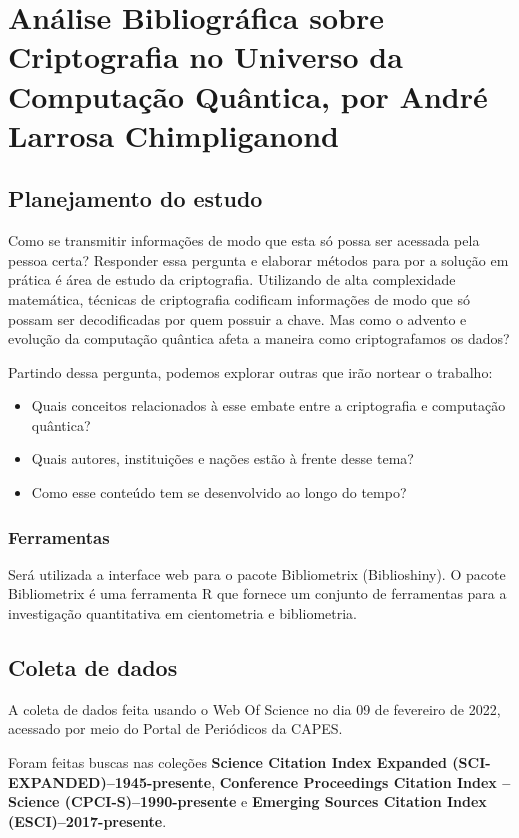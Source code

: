 
\chapter{Análise Bibliográfica sobre Criptografia no Universo da Computação Quântica, por André Larrosa Chimpliganond}

\section{Planejamento do estudo}
Como se transmitir informações de modo que esta só possa ser acessada pela pessoa certa? Responder essa pergunta e elaborar métodos para por a solução em prática é área de estudo da criptografia. Utilizando de alta complexidade matemática, técnicas de criptografia codificam informações de modo que só possam ser decodificadas por quem possuir a chave. Mas como o advento e evolução da computação quântica afeta a maneira como criptografamos os dados?

Partindo dessa pergunta, podemos explorar outras que irão nortear o trabalho:
\begin{itemize}
    \item Quais conceitos relacionados à esse embate entre a criptografia e computação quântica?
    \item Quais autores, instituições e nações estão à frente desse tema?
    \item Como esse conteúdo tem se desenvolvido ao longo do tempo?
\end{itemize}


\subsection{Ferramentas}
Será utilizada a interface web para o pacote Bibliometrix (Biblioshiny). O pacote Bibliometrix é uma ferramenta R que fornece um conjunto de ferramentas para a investigação quantitativa em cientometria e bibliometria.


\section{Coleta de dados}

A coleta de dados feita usando o Web Of Science  no dia 09 de fevereiro de 2022, acessado por meio do Portal de Periódicos da CAPES.

Foram feitas buscas nas coleções \textbf{Science Citation Index Expanded (SCI-EXPANDED)--1945-presente}, \textbf{Conference Proceedings Citation Index – Science (CPCI-S)--1990-presente} e \textbf{Emerging Sources Citation Index (ESCI)--2017-presente}. 

